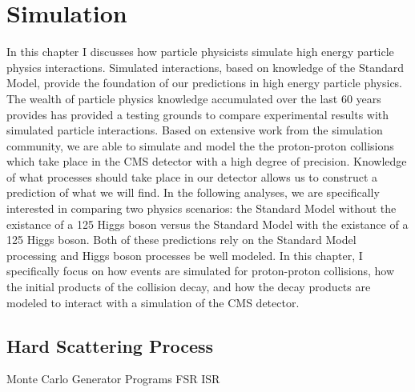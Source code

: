 \chapter{Simulation}
\label{sec:simulation}
In this chapter I discusses how particle physicists simulate high energy particle physics
interactions. Simulated interactions, based on knowledge of the Standard Model, provide 
the foundation of our predictions in high energy particle physics. 
The wealth of particle physics knowledge accumulated over the last 
60 years provides has provided a testing grounds to compare experimental results with
simulated particle interactions. Based on extensive work from the simulation community,
we are able to simulate and model the the proton-proton collisions which take place in the
CMS detector with a high degree of precision. Knowledge of what processes should take place
in our detector allows us to construct a prediction of what we will find. In the following
analyses, we are specifically interested in comparing two physics scenarios: the Standard Model 
without the existance of a 125 \GeV Higgs boson versus the Standard Model with the existance
of a 125 \GeV Higgs boson. Both of these predictions rely on the Standard Model processing and
Higgs boson processes be well modeled.
In this chapter, I specifically focus on how events are simulated for proton-proton collisions,
how the initial products of the collision decay, and how the decay products are modeled
to interact with a simulation of the CMS detector.


\section{Hard Scattering Process}
Monte Carlo Generator Programs
FSR ISR

